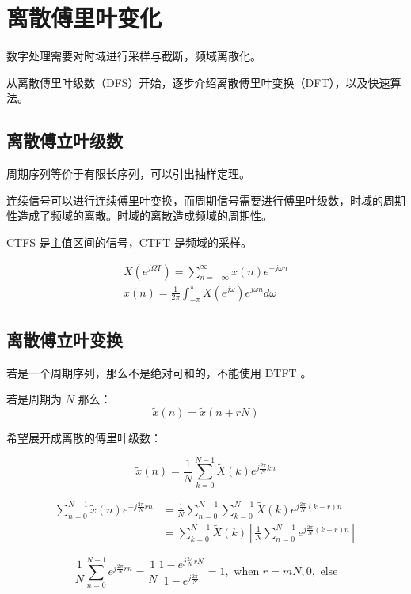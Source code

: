 \documentclass[cn,11pt,chinese,black,simple]{../elegantbook}
\begin{document}
\fi 
\def\chapname{04dft}

\chapter{离散傅里叶变化}

数字处理需要对时域进行采样与截断，频域离散化。

从离散傅里叶级数（DFS）开始，逐步介绍离散傅里叶变换（DFT），以及快速算法。

\section{离散傅立叶级数}

周期序列等价于有限长序列，可以引出抽样定理。

连续信号可以进行连续傅里叶变换，而周期信号需要进行傅里叶级数，时域的周期性造成了频域的离散。时域的离散造成频域的周期性。

CTFS 是主值区间的信号，CTFT 是频域的采样。

$$
\begin{array}{l}
X\left(e^{j \Omega T}\right)=\sum_{n=-\infty}^{\infty} x(n) e^{-j \omega n} \\
x(n)=\frac{1}{2 \pi} \int_{-\pi}^{\pi} X\left(e^{j \omega}\right) e^{j \omega n} d \omega
\end{array}
$$


\section{离散傅立叶变换}


若是一个周期序列，那么不是绝对可和的，不能使用 DTFT 。

若是周期为 \(N\) 那么：$$
\tilde{x}(n)=\tilde{x}(n+r N)
$$

希望展开成离散的傅里叶级数：

$$
\tilde{x}(n)=\frac{1}{N} \sum_{k=0}^{N-1} \tilde{X}(k) e^{j \frac{2 \pi}{N} k n}
$$

$$
\begin{aligned}
\sum_{n=0}^{N-1} \tilde{x}(n) e^{-j \frac{2 \pi}{N} r n} &=\frac{1}{N} \sum_{n=0}^{N-1} \sum_{k=0}^{N-1} \tilde{X}(k) e^{j \frac{2 \pi}{N}(k-r) n} \\
&=\sum_{k=0}^{N-1} \tilde{X}(k)\left[\frac{1}{N} \sum_{n=0}^{N-1} e^{j \frac{2 \pi}{N}(k-r) n}\right]
\end{aligned}
$$

$$
\frac{1}{N} \sum_{n=0}^{N-1} e^{j \frac{2 \pi}{N} r n}=\frac{1}{N} \frac{1-e^{j \frac{2 \pi}{N} r N}}{1-e_{}^{j \frac{2 \pi}{N}}}= 1, \text{ when } r = mN , 0 , \text{ else} 
$$
\end{document}
